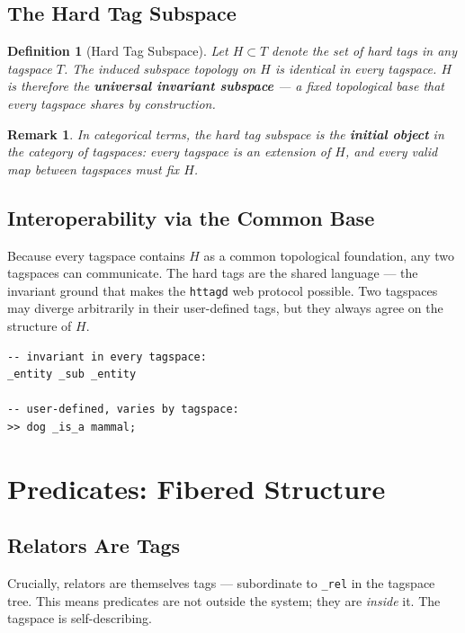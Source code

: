 \documentclass{article}
\newtheorem{definition}{Definition}[section]
\newtheorem{remark}{Remark}[section]
\begin{document}
\subsection{The Hard Tag Subspace}

\begin{definition}[Hard Tag Subspace]
Let $H \subset T$ denote the set of hard tags in any tagspace $T$. The
induced subspace topology on $H$ is identical in every tagspace. $H$ is
therefore the \textbf{universal invariant subspace} --- a fixed topological
base that every tagspace shares by construction.
\end{definition}

\begin{remark}
In categorical terms, the hard tag subspace is the \textbf{initial object} in
the category of tagspaces: every tagspace is an extension of $H$, and every
valid map between tagspaces must fix $H$.
\end{remark}

\subsection{Interoperability via the Common Base}

Because every tagspace contains $H$ as a common topological foundation, any
two tagspaces can communicate. The hard tags are the shared language --- the
invariant ground that makes the \texttt{httagd} web protocol possible. Two
tagspaces may diverge arbitrarily in their user-defined tags, but they always
agree on the structure of $H$.

\begin{lstlisting}[style=tagl, caption={Hard tags are invariant; user tags vary}]
-- invariant in every tagspace:
_entity _sub _entity

-- user-defined, varies by tagspace:
>> dog _is_a mammal;
\end{lstlisting}

\section{Predicates: Fibered Structure}

\subsection{Relators Are Tags}

Crucially, relators are themselves tags --- subordinate to \texttt{\_rel} in
the tagspace tree. This means predicates are not outside the system; they are
\emph{inside} it. The tagspace is self-describing.
\end{document}
